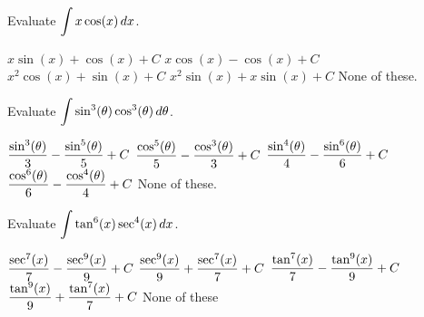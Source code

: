 \documentclass[12pt]{exam}
\newcommand{\ds}{\ensuremath{\displaystyle}}
\begin{document}
\begin{center}
\end{center}
\vspace{0.1in}

\begin{questions}

\setcounter{question}{0}
\question[10]
Evaluate $\ds \int x\cos(x) \, dx$.

\begin{checkboxes}
\CorrectChoice $x\sin(x)+\cos(x)+C$
\choice $x\cos(x)-\cos(x)+C$
\CorrectChoice $x^2\cos(x)+\sin(x)+C$
\choice $x^2\sin(x)+x\sin(x)+C$
\choice None of these.
\end{checkboxes}

\vfill

\question[10]
Evaluate $\ds \int \sin^3(\theta)\cos^3(\theta) \, d\theta$.

\begin{checkboxes}
\choice $\ds\frac{\sin^3(\theta)}{3}-\frac{\sin^5(\theta)}{5}+C$
\choice $\ds\frac{\cos^5(\theta)}{5}-\frac{\cos^3(\theta)}{3}+C$
\CorrectChoice $\ds\frac{\sin^4(\theta)}{4}-\frac{\sin^6(\theta)}{6}+C$
\CorrectChoice $\ds\frac{\cos^6(\theta)}{6}-\frac{\cos^4(\theta)}{4}+C$
\choice None of these.
\end{checkboxes}

\vfill

\question[10]
Evaluate $\ds \int \tan^6(x)\sec^4(x) \, dx$.

\begin{checkboxes}
\choice $\ds\frac{\sec^7(x)}{7}-\frac{\sec^9(x)}{9}+C$
\choice $\ds\frac{\sec^9(x)}{9}+\frac{\sec^7(x)}{7}+C$
\choice $\ds\frac{\tan^7(x)}{7}-\frac{\tan^9(x)}{9}+C$
\CorrectChoice $\ds\frac{\tan^9(x)}{9}+\frac{\tan^7(x)}{7}+C$
\choice None of these
\end{checkboxes}

\vfill

\end{questions}
\end{document}
